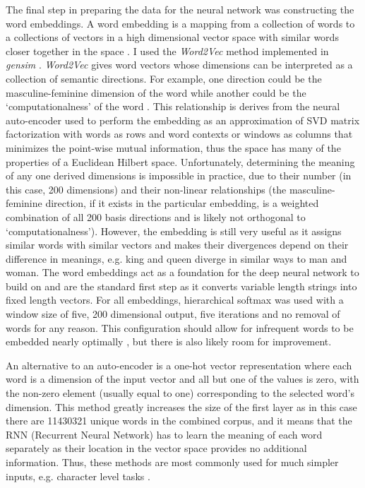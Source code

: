 \documentclass[12pt, a4paper]{article}
\begin{document}
The final step in preparing the data for the neural network was constructing the word embeddings. A word embedding is a mapping from a collection of words to a collections of vectors in a high dimensional vector space with similar words closer together in the space \citep{wordembeding}. I used the \textit{Word2Vec} method \citep{mikolov2013efficient} implemented in \textit{gensim} \citep{rehurek_lrec}. \textit{Word2Vec} gives word vectors whose dimensions can be interpreted as a collection of semantic directions. For example, one direction could be the masculine-feminine dimension of the word while another could be the `computationalness' of the word \citep{bolukbasi2016man}. This relationship is derives from the neural auto-encoder used to perform the embedding as an approximation of SVD matrix factorization with words as rows and word contexts or windows as columns \citep{levy2014neural} that minimizes the point-wise mutual information, thus the space has many of the properties of a Euclidean Hilbert space. Unfortunately, determining the meaning of any one derived dimensions is impossible in practice, due to their number (in this case, 200 dimensions) and their non-linear relationships (the masculine-feminine direction, if it exists in the particular embedding, is a weighted combination of all 200 basis directions and is likely not orthogonal to `computationalness'). However, the embedding is still very useful as it assigns similar words with similar vectors and makes their divergences depend on their difference in meanings, e.g. king and queen diverge in similar ways to man and woman. The word embeddings act as a foundation for the deep neural network to build on and are the standard first step \citep{deep_learning_chapter12} as it converts variable length strings into fixed length vectors. For all embeddings, hierarchical softmax was used with a window size of five, 200 dimensional output, five iterations and no removal of words for any reason. This configuration should allow for infrequent words to be embedded nearly optimally  \citep{rehurek_lrec}, but there is also likely room for improvement.

An alternative to an auto-encoder is a one-hot vector representation where each word is a dimension of the input vector and all but one of the values is zero, with the non-zero element (usually equal to one) corresponding to the selected word's dimension. This method greatly increases the size of the first layer as in this case there are \num{11430321} unique words in the combined corpus, and it means that the RNN (Recurrent Neural Network) has to learn the meaning of each word separately as their location in the vector space provides no additional information. Thus, these methods are most commonly used for much simpler inputs, e.g. character level tasks \citep{rodriguez1999recurrent}.
 
\end{document}
